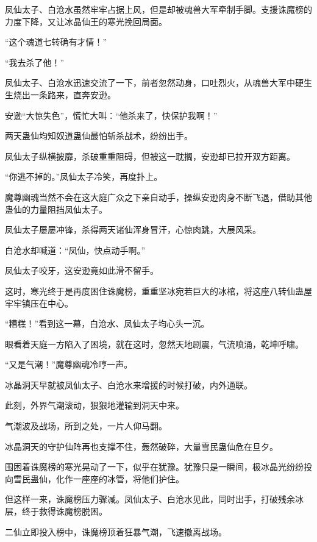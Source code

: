 \begin{this_body}
凤仙太子、白沧水虽然牢牢占据上风，但是却被魂兽大军牵制手脚。支援诛魔榜的力度下降，又让冰晶仙王的寒光挽回局面。

“这个魂道七转确有才情！”

“我去杀了他！”

凤仙太子、白沧水迅速交流了一下，前者忽然动身，口吐烈火，从魂兽大军中硬生生烧出一条路来，直奔安逊。

安逊“大惊失色”，慌忙大叫：“他杀来了，快保护我啊！”

两天蛊仙均知奴道蛊仙最怕斩杀战术，纷纷出手。

凤仙太子纵横披靡，杀破重重阻碍，但被这一耽搁，安逊却已拉开双方距离。

“你逃不掉的。”凤仙太子冷笑，再度扑上。

魔尊幽魂当然不会在这大庭广众之下亲自动手，操纵安逊肉身不断飞退，借助其他蛊仙的力量阻挡凤仙太子。

凤仙太子屡屡冲锋，杀得两天诸仙浑身冒汗，心惊肉跳，大展风采。

白沧水却喊道：“凤仙，快点动手啊。”

凤仙太子咬牙，这安逊竟如此滑不留手。

这时，寒光终于是再度困住诛魔榜，重重坚冰宛若巨大的冰棺，将这座八转仙蛊屋牢牢镇压在中心。

“糟糕！”看到这一幕，白沧水、凤仙太子均心头一沉。

眼看着天庭一方陷入了困境，就在这时，忽然天地剧震，气流喷涌，乾坤呼啸。

“又是气潮！”魔尊幽魂冷哼一声。

冰晶洞天早就被凤仙太子、白沧水来增援的时候打破，内外通联。

此刻，外界气潮滚动，狠狠地灌输到洞天中来。

气潮波及战场，所到之处，一片人仰马翻。

冰晶洞天的守护仙阵再也支撑不住，轰然破碎，大量雪民蛊仙危在旦夕。

围困着诛魔榜的寒光晃动了一下，似乎在犹豫。犹豫只是一瞬间，极冰晶光纷纷投向雪民蛊仙，化作一座座的冰管，将他们护住。

但这样一来，诛魔榜压力骤减。凤仙太子、白沧水见此，同时出手，打破残余冰层，终于救得诛魔榜脱困。

二仙立即投入榜中，诛魔榜顶着狂暴气潮，飞速撤离战场。

\end{this_body}

